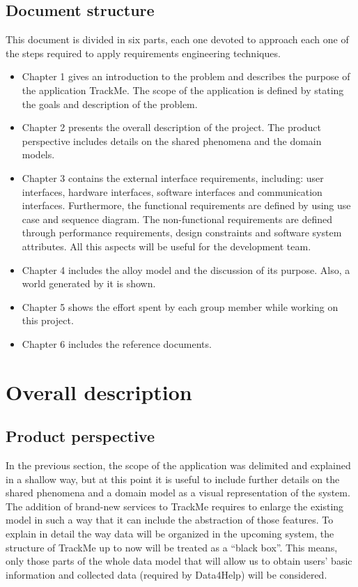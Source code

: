 \documentclass[12pt]{report}
\begin{document}
\section{Document structure}
This document is divided in six parts, each one devoted to approach each one of the steps required to apply requirements engineering techniques.
\begin{itemize}
\item Chapter 1 gives an introduction to the problem and describes the purpose of the application TrackMe. The scope of the application is defined by stating the goals and description of the problem.
\item Chapter 2 presents the overall description of the project. The product perspective includes details on the shared phenomena and the domain models.
\item Chapter 3 contains the external interface requirements, including: user interfaces, hardware interfaces, software interfaces and communication interfaces. Furthermore, the functional requirements are defined by using use case and sequence diagram. The non-functional requirements are defined through performance requirements, design constraints and software system attributes. All this aspects will be useful for the development team.
\item Chapter 4 includes the alloy model and the discussion of its purpose. Also, a world generated by it is shown.
\item Chapter 5 shows the effort spent by each group member while working on this project.
\item Chapter 6 includes the reference documents.
\end{itemize}

\chapter{Overall description}
\section{Product perspective}
In the previous section, the scope of the application was delimited and explained in a shallow way, but at this point it is useful to include further details on the shared phenomena and a domain model as a visual representation of the system.  \\

The addition of brand-new services to TrackMe requires to enlarge the existing model in such a way that it can include the abstraction of those features. To explain in detail the way data will be organized in the upcoming system, the structure of TrackMe up to now will be treated as a “black box”. This means, only those parts of the whole data model that will allow us to obtain users’ basic information and collected data (required by Data4Help) will be considered. \\
\end{document}
